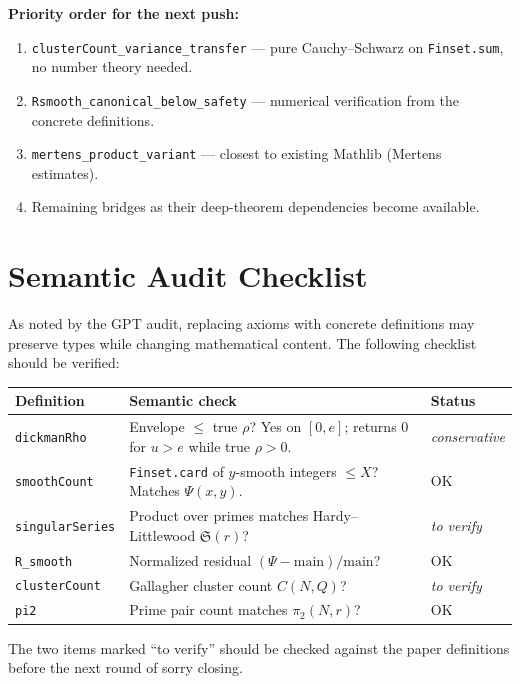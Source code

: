 \documentclass[11pt,a4paper]{article}
\begin{document}
\textbf{Priority order for the next push:}
\begin{enumerate}[nosep]
    \item \texttt{clusterCount\_variance\_transfer} --- pure Cauchy--Schwarz on \texttt{Finset.sum}, no number theory needed.
    \item \texttt{Rsmooth\_canonical\_below\_safety} --- numerical verification from the concrete definitions.
    \item \texttt{mertens\_product\_variant} --- closest to existing Mathlib (Mertens estimates).
    \item Remaining bridges as their deep-theorem dependencies become available.
\end{enumerate}

\section{Semantic Audit Checklist}

As noted by the GPT audit, replacing axioms with concrete definitions may preserve types while changing mathematical content.  The following checklist should be verified:

\begin{center}
\begin{tabular}{@{}lp{8cm}l@{}}
\toprule
\textbf{Definition} & \textbf{Semantic check} & \textbf{Status} \\
\midrule
\texttt{dickmanRho} & Envelope $\le$ true $\rho$? Yes on $[0,e]$; returns 0 for $u>e$ while true $\rho>0$. & \textit{conservative} \\
\texttt{smoothCount} & \texttt{Finset.card} of $y$-smooth integers $\le X$? Matches $\Psi(x,y)$. & OK \\
\texttt{singularSeries} & Product over primes matches Hardy--Littlewood $\mathfrak{S}(r)$? & \textit{to verify} \\
\texttt{R\_smooth} & Normalized residual $(\Psi - \text{main})/\text{main}$? & OK \\
\texttt{clusterCount} & Gallagher cluster count $C(N,Q)$? & \textit{to verify} \\
\texttt{pi2} & Prime pair count matches $\pi_2(N,r)$? & OK \\
\bottomrule
\end{tabular}
\end{center}

The two items marked ``to verify'' should be checked against the paper definitions before the next round of sorry closing.
\end{document}
